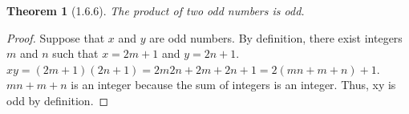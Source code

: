 \documentclass[a4paper, 12pt]{article}
\theoremstyle{plain}
\newtheorem*{theorem*}{Theorem}
\begin{document}
	
	\begin{theorem*}[1.6.6]
		The product of two odd numbers is odd.
	\end{theorem*}
	
	\begin{proof}
		Suppose that $x$ and $y$ are odd numbers. By definition, there exist integers $m$ and $n$ 
		such that $x = 2m + 1$ and $y = 2n + 1$. 
		$xy = (2m + 1)(2n + 1) = 2m2n + 2m + 2n + 1 = 2(mn + m + n) + 1$. 
		$mn + m + n$ is an integer because the sum of integers is an integer. Thus, xy is odd by 
		definition.
	\end{proof}
\end{document}

